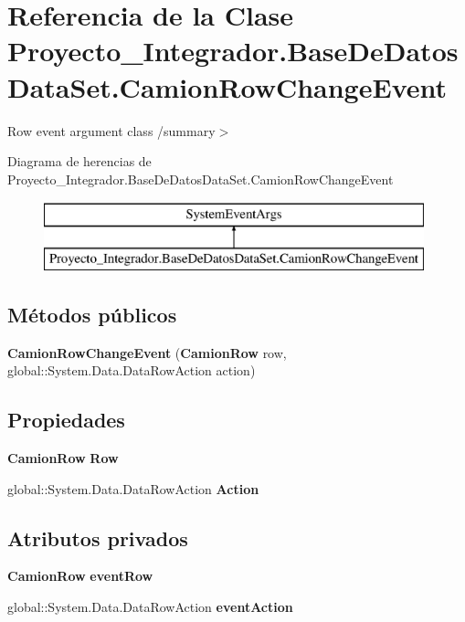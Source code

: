 \section{Referencia de la Clase Proyecto\-\_\-\-Integrador.\-Base\-De\-Datos\-Data\-Set.\-Camion\-Row\-Change\-Event}
\label{class_proyecto___integrador_1_1_base_de_datos_data_set_1_1_camion_row_change_event}


Row event argument class /summary$>$  


Diagrama de herencias de Proyecto\-\_\-\-Integrador.\-Base\-De\-Datos\-Data\-Set.\-Camion\-Row\-Change\-Event\begin{figure}[H]
\begin{center}
\leavevmode
\includegraphics[height=2.000000cm]{class_proyecto___integrador_1_1_base_de_datos_data_set_1_1_camion_row_change_event}
\end{center}
\end{figure}
\subsection*{Métodos públicos}
\begin{DoxyCompactItemize}
\item 
{\bf Camion\-Row\-Change\-Event} ({\bf Camion\-Row} row, global\-::\-System.\-Data.\-Data\-Row\-Action action)
\end{DoxyCompactItemize}
\subsection*{Propiedades}
\begin{DoxyCompactItemize}
\item 
{\bf Camion\-Row} {\bf Row}\hspace{0.3cm}{\ttfamily  [get]}
\item 
global\-::\-System.\-Data.\-Data\-Row\-Action {\bf Action}\hspace{0.3cm}{\ttfamily  [get]}
\end{DoxyCompactItemize}
\subsection*{Atributos privados}
\begin{DoxyCompactItemize}
\item 
{\bf Camion\-Row} {\bf event\-Row}
\item 
global\-::\-System.\-Data.\-Data\-Row\-Action {\bf event\-Action}
\end{DoxyCompactItemize}


